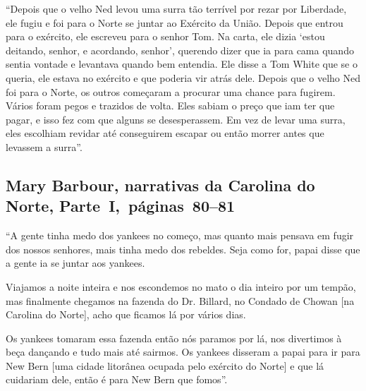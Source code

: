 ``Depois que o velho Ned levou uma surra tão terrível por rezar por
Liberdade, ele fugiu e foi para o Norte se juntar ao Exército da União. \enlargethispage{\baselineskip}
Depois que entrou para o exército, ele escreveu para o senhor Tom. Na
carta, ele dizia `estou deitando, senhor, e acordando, senhor', querendo
dizer que ia para cama quando sentia vontade e levantava quando bem
entendia. Ele disse a Tom White que se o queria, ele estava no exército
e que poderia vir atrás dele. Depois que o velho Ned foi para o Norte,
os outros começaram a procurar uma chance para fugirem. Vários foram
pegos e trazidos de volta. Eles sabiam o preço que iam ter que pagar, e
isso fez com que alguns se desesperassem. Em vez de levar uma surra,
eles escolhiam revidar até conseguirem escapar ou então morrer antes
que levassem a surra''.

\subsection{Mary Barbour, narrativas da Carolina do Norte, Parte~I,~páginas~80--81} \label{ref15}

``A gente tinha medo dos yankees no começo, mas quanto mais pensava em
fugir dos nossos senhores, mais tinha medo dos rebeldes. Seja como for,
papai disse que a gente ia se juntar aos yankees.

Viajamos a noite inteira e nos escondemos no mato o dia inteiro por um
tempão, mas finalmente chegamos na fazenda do Dr. Billard, no Condado de
Chowan {[}na Carolina do Norte{]}, acho que ficamos lá por vários dias.

Os yankees tomaram essa fazenda então nós paramos por lá, nos divertimos 
à beça dançando e tudo mais até sairmos. Os yankees disseram a papai
para ir para New Bern {[}uma cidade litorânea ocupada pelo exército do 
Norte{]} e que lá cuidariam dele, então é para New Bern que fomos''. \enlargethispage{\baselineskip}

\pagebreak
\thispagestyle{empty}
\movetoevenpage
\thispagestyle{empty}

